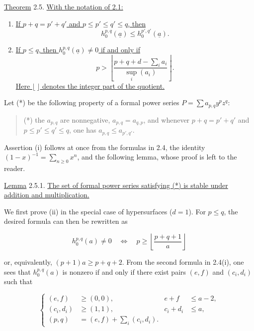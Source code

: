 \underline{Theorem} 2.5. \underline{With the notation of 2.1:}

\begin{enumerate}[label=(\roman*),leftmargin=2.6em]
\item \underline{If $p+q=p'+q'$ and
$p\leq p'\leq q'\leq q$, then}
\begin{equation*}
h_0^{p,q}(\underline a)\leq h_0^{p',q'}(\underline a).
\end{equation*}

\item \underline{If $p\leq q$, then $h_0^{p,q}(\underline a)\ne0$ if
and only if}
\begin{equation*}
p>\left\lfloor
\frac{p+q+d-\sum_i a_i}{\sup_i(a_i)}
\right\rfloor.
\end{equation*}
\underline{Here $\lfloor\ \rfloor$ denotes the integer part of the
quotient.}
\end{enumerate}


Let (*) be the following property of a formal power series
$P=\sum a_{p,q}y^pz^q$:

\begin{quote}
(*) the $a_{p,q}$ are nonnegative, $a_{p,q}=a_{q,p}$, and whenever
$p+q=p'+q'$ and $p\leq p'\leq q'\leq q$, one has
$a_{p,q}\leq a_{p',q'}$.
\end{quote}

Assertion (i) follows at once from the formulas in 2.4, the identity
$(1-x)^{-1}=\sum_{n\geq0}x^n$, and the following lemma, whose proof is left
to the reader.

\underline{Lemma} 2.5.1. \underline{The set of formal power series
satisfying (*) is stable under addition and multiplication.}

We first prove (ii) in the special case of hypersurfaces ($d=1$).  For
$p\leq q$, the desired formula can then be rewritten as

\begin{equation}\tag{2.5.2}
h_0^{p,q}(a)\ne0
\quad\Longleftrightarrow\quad
p\geq\left\lfloor\frac{p+q+1}{a}\right\rfloor
\end{equation}

or, equivalently, $(p+1)a\geq p+q+2$.  From the second formula in 2.4(i),
one sees that $h_0^{p,q}(a)$ is nonzero if and only if there exist pairs
$(e,f)$ and $(c_i,d_i)$ such that

\begin{equation}\tag{2.5.3}
\left\{
\begin{aligned}
(e,f)&\geq(0,0),& e+f&\leq a-2,\\
(c_i,d_i)&\geq(1,1),& c_i+d_i&\leq a,\\
(p,q)&=(e,f)+\sum_i(c_i,d_i).&&
\end{aligned}
\right.
\end{equation}

